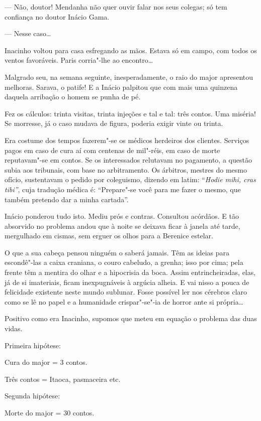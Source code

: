 --- Não, doutor! Mendanha não quer ouvir falar nos seus colegas; só tem
confiança no doutor Inácio Gama.

--- Nesse caso\ldots{}

Inacinho voltou para casa esfregando as mãos. Estava só em campo, com
todos os ventos favoráveis. Paris corria"-lhe ao encontro\ldots{}

Malgrado seu, na semana seguinte, inesperadamente, o raio do major
apresentou melhoras. Sarava, o patife! E a Inácio palpitou que com mais
uma quinzena daquela arribação o homem se punha de pé.

Fez os cálculos: trinta visitas, trinta injeções e tal e tal: três
contos. Uma miséria! Se morresse, já o caso mudava de figura, poderia
exigir vinte ou trinta.

Era costume dos tempos fazerem"-se os médicos herdeiros dos clientes.
Serviços pagos em caso de cura aí com centenas de mil"-réis, em caso de
morte reputavam"-se em contos. Se os interessados relutavam no pagamento,
a questão subia aos tribunais, com base no arbitramento. Os árbitros,
mestres do mesmo ofício, sustentavam o pedido por coleguismo, dizendo em
latim: ``\emph{Hodie mihi, cras tibi''}, cuja tradução médica é:
``Prepare"-se você para me fazer o mesmo, que também pretendo dar a minha
cartada''.

Inácio ponderou tudo isto. Mediu prós e contras. Consultou acórdãos. E
tão absorvido no problema andou que à noite se deixava ficar à janela
até tarde, mergulhado em cismas, sem erguer os olhos para a Berenice
estelar.

O que a sua cabeça pensou ninguém o saberá jamais. Têm as ideias para
escondê"-las a caixa craniana, o couro cabeludo, a grenha; isso por cima;
pela frente têm a mentira do olhar e a hipocrisia da boca. Assim
entrincheiradas, elas, já de si imateriais, ficam inexpugnáveis à
argúcia alheia. E vai nisso a pouca de felicidade existente neste mundo
sublunar. Fosse possível ler nos cérebros claro como se lê no papel e a
humanidade crispar"-se"-ia de horror ante si própria\ldots{}

Positivo como era Inacinho, supomos que meteu em equação o problema das
duas vidas.

Primeira hipótese:

Cura do major = 3 contos.

Três contos = Itaoca, pasmaceira etc.

Segunda hipótese:

Morte do major = 30 contos.

